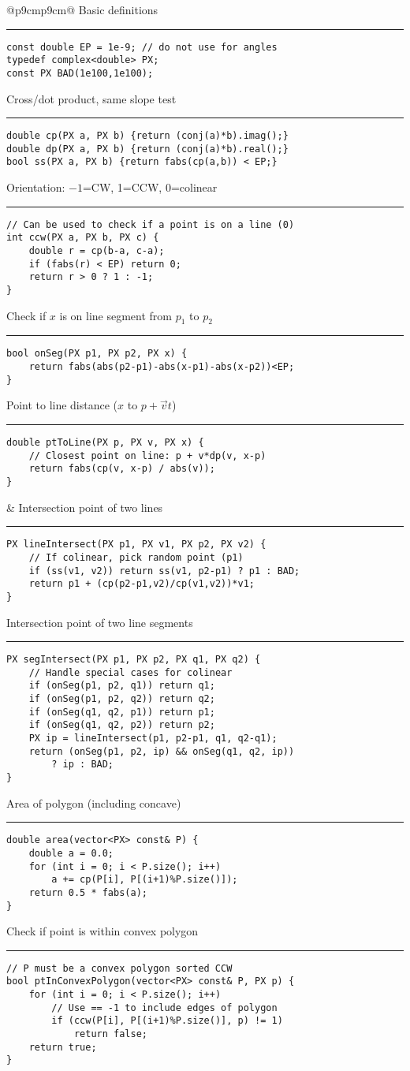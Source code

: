\documentclass[letterpaper]{article}
\newcommand{\rx}[1]{#1\hrule}
\begin{document}
\begin{tabular}{@{}p{9cm}p{9cm}@{}}
\rx{Basic definitions}
\begin{lstlisting}
const double EP = 1e-9; // do not use for angles
typedef complex<double> PX;
const PX BAD(1e100,1e100);
\end{lstlisting}
\rx{Cross/dot product, same slope test}
\begin{lstlisting}
double cp(PX a, PX b) {return (conj(a)*b).imag();}
double dp(PX a, PX b) {return (conj(a)*b).real();}
bool ss(PX a, PX b) {return fabs(cp(a,b)) < EP;}
\end{lstlisting}
\rx{Orientation: $-1$=CW, 1=CCW, 0=colinear}
\begin{lstlisting}
// Can be used to check if a point is on a line (0)
int ccw(PX a, PX b, PX c) { 
	double r = cp(b-a, c-a);
	if (fabs(r) < EP) return 0;
	return r > 0 ? 1 : -1;
}
\end{lstlisting}
\rx{Check if $x$ is on line segment from $p_1$ to $p_2$}
\begin{lstlisting}
bool onSeg(PX p1, PX p2, PX x) { 
	return fabs(abs(p2-p1)-abs(x-p1)-abs(x-p2))<EP;
}
\end{lstlisting}
\rx{Point to line distance ($x$ to $p+\vec vt$)}
\begin{lstlisting}
double ptToLine(PX p, PX v, PX x) {
	// Closest point on line: p + v*dp(v, x-p)
	return fabs(cp(v, x-p) / abs(v));
}
\end{lstlisting}
&
\rx{Intersection point of two lines}
\begin{lstlisting}
PX lineIntersect(PX p1, PX v1, PX p2, PX v2) {
	// If colinear, pick random point (p1)
	if (ss(v1, v2)) return ss(v1, p2-p1) ? p1 : BAD; 
	return p1 + (cp(p2-p1,v2)/cp(v1,v2))*v1;
}
\end{lstlisting}
\rx{Intersection point of two line segments}
\begin{lstlisting}
PX segIntersect(PX p1, PX p2, PX q1, PX q2) {
	// Handle special cases for colinear
	if (onSeg(p1, p2, q1)) return q1;
	if (onSeg(p1, p2, q2)) return q2;
	if (onSeg(q1, q2, p1)) return p1;
	if (onSeg(q1, q2, p2)) return p2;
	PX ip = lineIntersect(p1, p2-p1, q1, q2-q1);
	return (onSeg(p1, p2, ip) && onSeg(q1, q2, ip))
		? ip : BAD;
}
\end{lstlisting}
\rx{Area of polygon (including concave)}
\begin{lstlisting}
double area(vector<PX> const& P) {
	double a = 0.0;
	for (int i = 0; i < P.size(); i++)
		a += cp(P[i], P[(i+1)%P.size()]);
	return 0.5 * fabs(a);
}
\end{lstlisting}
\rx{Check if point is within convex polygon}
\begin{lstlisting}
// P must be a convex polygon sorted CCW
bool ptInConvexPolygon(vector<PX> const& P, PX p) {
	for (int i = 0; i < P.size(); i++)
		// Use == -1 to include edges of polygon
		if (ccw(P[i], P[(i+1)%P.size()], p) != 1)
			return false;
	return true;
}
\end{lstlisting}
\end{tabular}
\end{document}
